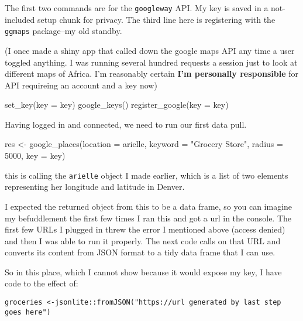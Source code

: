 \documentclass[]{tufte-handout}
\newenvironment{Shaded}{}{}
\newcommand{\AttributeTok}[1]{\textcolor[rgb]{0.49,0.56,0.16}{#1}}
\newcommand{\DecValTok}[1]{\textcolor[rgb]{0.25,0.63,0.44}{#1}}
\newcommand{\FunctionTok}[1]{\textcolor[rgb]{0.02,0.16,0.49}{#1}}
\newcommand{\NormalTok}[1]{#1}
\newcommand{\OtherTok}[1]{\textcolor[rgb]{0.00,0.44,0.13}{#1}}
\newcommand{\StringTok}[1]{\textcolor[rgb]{0.25,0.44,0.63}{#1}}
\begin{document}
The first two commands are for the \texttt{googleway} API. My key is
saved in a not-included setup chunk for privacy. The third line here is
registering with the \texttt{ggmaps} package--my old standby.

(I once made a shiny app that called down the google maps API any time a
user toggled anything. I was running several hundred requests a session
just to look at different maps of Africa. I'm reasonably certain
\textbf{I'm personally responsible} for API requireing an account and a
key now)

\begin{Shaded}
\begin{Highlighting}[]
\FunctionTok{set\_key}\NormalTok{(}\AttributeTok{key =}\NormalTok{ key)}
\FunctionTok{google\_keys}\NormalTok{()}
\FunctionTok{register\_google}\NormalTok{(}\AttributeTok{key =}\NormalTok{ key)}
\end{Highlighting}
\end{Shaded}

Having logged in and connected, we need to run our first data pull.

\begin{Shaded}
\begin{Highlighting}[]
\NormalTok{res }\OtherTok{\textless{}{-}} \FunctionTok{google\_places}\NormalTok{(}\AttributeTok{location =}\NormalTok{ arielle,}
                     \AttributeTok{keyword =} \StringTok{"Grocery Store"}\NormalTok{,}
                     \AttributeTok{radius =} \DecValTok{5000}\NormalTok{,}
                     \AttributeTok{key =}\NormalTok{ key)}
\end{Highlighting}
\end{Shaded}

this is calling the \texttt{arielle} object I made earlier, which is a
list of two elements representing her longitude and latitude in Denver.

I expected the returned object from this to be a data frame, so you can
imagine my befuddlement the first few times I ran this and got a url in
the console. The first few URLs I plugged in threw the error I mentioned
above (access denied) and then I was able to run it properly. The next
code calls on that URL and converts its content from JSON format to a
tidy data frame that I can use.

So in this place, which I cannot show because it would expose my key, I
have code to the effect of:

\begin{verbatim}
groceries <-jsonlite::fromJSON("https://url generated by last step goes here")
\end{verbatim}
\end{document}
